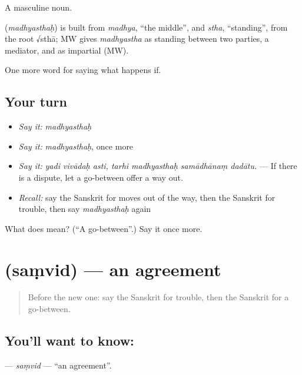 A masculine noun.

\begin{cousinweb}
\textbf{} (\emph{madhyasthaḥ}) is built from \emph{madhya}, \textquotedblleft{}the middle\textquotedblright{}, and \emph{stha}, \textquotedblleft{}standing\textquotedblright{}, from the root √sthā; MW gives \emph{madhyastha} as standing between two parties, a mediator, and as impartial (MW).
\end{cousinweb}

\begin{grammarlens}[title={What you've built}]
One more word for saying what happens if.
\end{grammarlens}

\subsection*{Your turn}
\begin{itemize}
\raggedright
  \item \emph{Say it:} \emph{madhyasthaḥ}
  \item \emph{Say it:} \emph{madhyasthaḥ}, once more
  \item \emph{Say it:} \emph{yadi vivādaḥ asti, tarhi madhyasthaḥ samādhānaṃ dadātu.} — If there is a dispute, let a go-between offer a way out.
  \item \emph{Recall:} say the Sanskrit for moves out of the way, then the Sanskrit for trouble, then say \emph{madhyasthaḥ} again
\end{itemize}

\begin{tcolorbox}[breakable,colback=teal!4,colframe=teal!35!black,title={Before you move on}]
What does  mean? (\textquotedblleft{}A go-between\textquotedblright{}.) Say it once more.
\end{tcolorbox}
\section[\texorpdfstring{\sk{संविद्} (saṃvid)}{संविद् (saṃvid)}]{ (saṃvid) — an agreement}

\label{lesson:SA-C534-samvid}



\begin{quote}
Before the new one: say the Sanskrit for trouble, then the Sanskrit for a go-between.
\end{quote}

\subsection*{You'll want to know: }
\textbf{} — \emph{saṃvid} — \textquotedblleft{}an agreement\textquotedblright{}.

